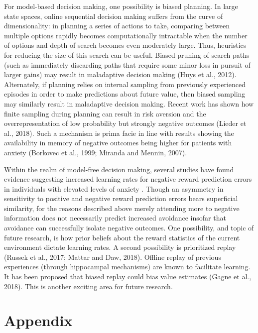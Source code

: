 \documentclass[11pt]{article} %
\begin{document}
For model-based decision making, one possibility is biased planning. In large
state spaces, online sequential decision making suffers from the curve of
dimensionality: in planning a series of actions to take, comparing between
multiple options rapidly becomes computationally intractable when the number of
options and depth of search becomes even moderately large. Thus, heuristics for
reducing the size of this search can be useful. Biased pruning of search paths
(such as immediately discarding paths that require some minor loss in pursuit of
larger gains) may result in maladaptive decision making (Huys et al., 2012).
Alternately, if planning relies on internal sampling from previously experienced
episodes in order to make predictions about future value, then biased sampling
may similarly result in maladaptive decision making. Recent work has shown how
finite sampling during planning can result in risk aversion and the overrepresentation
of low probability but strongly negative outcomes (Lieder et al., 2018). Such a
mechanism is prima facie in line with results showing the availability in memory
of negative outcomes being higher for patients with anxiety (Borkovec et al., 1999;
Miranda and Mennin, 2007).

Within the realm of model-free decision making, several studies have found evidence
suggesting increased learning rates for negative reward prediction errors in
individuals with elevated levels of anxiety \citep{Aylward, Huang2017, Harle2017
garrett2018}. Though an asymmetry in sensitivity to
positive and negative reward prediction errors bears superficial similarity, for
the reasons described above merely attending more to negative information does not
necessarily predict increased avoidance insofar that avoidance can successfully
isolate negative outcomes. One possibility, and topic of future research, is how
prior beliefs about the reward statistics of the current environment dictate
learning rates. A second possibility is prioritized replay (Russek et al., 2017;
Mattar and Daw, 2018). Offline replay of previous experiences (through hippocampal
mechanisms) are known to facilitate learning. It has been proposed that biased
replay could bias value estimates (Gagne et al., 2018). This is another exciting
area for future research.





\section{Appendix}
\end{document}
